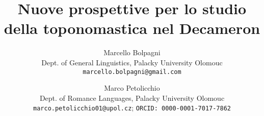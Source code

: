 \documentclass[11pt,a4paper, oneside]{article}
\begin{document}
\title{Nuove prospettive per lo studio della toponomastica nel Decameron}
\author{
  Marcello Bolpagni\\
  Dept. of General Linguistics, Palacky University Olomouc \\
  \texttt{marcello.bolpagni@gmail.com}
  \and
  Marco Petolicchio\\
  Dept. of Romance Languages, Palacky University Olomouc\\
  \texttt{marco.petolicchio01@upol.cz};
  \texttt{ORCID: 0000-0001-7017-7862}\\
}\maketitle

\tableofcontents
\newpage


\printbibliography
\end{document}
